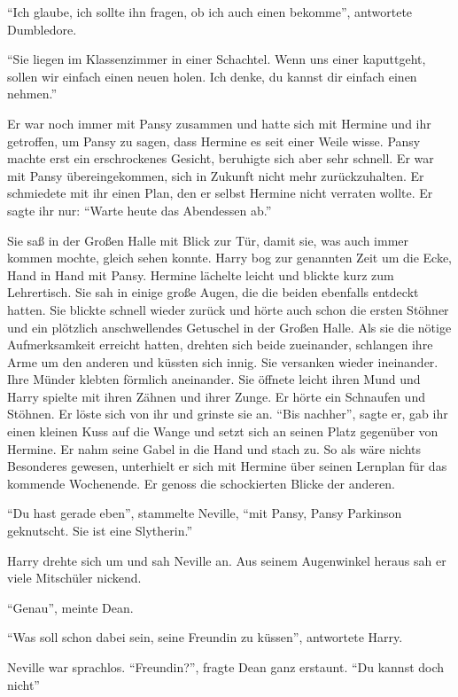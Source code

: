 \enquote{Ich glaube, ich sollte ihn fragen, ob ich auch einen bekomme}, antwortete Dumbledore.

\enquote{Sie liegen im Klassenzimmer in einer Schachtel. Wenn uns einer kaputtgeht, sollen wir einfach einen neuen holen. Ich denke, du kannst dir einfach einen nehmen.}

\trenn

Er war noch immer mit Pansy zusammen und hatte sich mit Hermine und ihr getroffen, um Pansy zu sagen, dass Hermine es seit einer Weile wisse. Pansy machte erst ein erschrockenes Gesicht, beruhigte sich aber sehr schnell. Er war mit Pansy übereingekommen, sich in Zukunft nicht mehr zurückzuhalten. Er schmiedete mit ihr einen Plan, den er selbst Hermine nicht verraten wollte. Er sagte ihr nur: \enquote{Warte heute das Abendessen ab.}

Sie saß in der Großen Halle mit Blick zur Tür, damit sie, was auch immer kommen mochte, gleich sehen konnte. Harry bog zur genannten Zeit um die Ecke, Hand in Hand mit Pansy. Hermine lächelte leicht und blickte kurz zum Lehrertisch. Sie sah in einige große Augen, die die beiden ebenfalls entdeckt hatten. Sie blickte schnell wieder zurück und hörte auch schon die ersten Stöhner und ein plötzlich anschwellendes Getuschel in der Großen Halle. Als sie die nötige Aufmerksamkeit erreicht hatten, drehten sich beide zueinander, schlangen ihre Arme um den anderen und küssten sich innig. Sie versanken wieder ineinander. Ihre Münder klebten förmlich aneinander. Sie öffnete leicht ihren Mund und Harry spielte mit ihren Zähnen und ihrer Zunge. Er hörte ein Schnaufen und Stöhnen. Er löste sich von ihr und grinste sie an. \enquote{Bis nachher}, sagte er, gab ihr einen kleinen Kuss auf die Wange und setzt sich an seinen Platz gegenüber von Hermine. Er nahm seine Gabel in die Hand und stach zu. So als wäre nichts Besonderes gewesen, unterhielt er sich mit Hermine über seinen Lernplan für das kommende Wochenende. Er genoss die schockierten Blicke der anderen.

\enquote{Du hast gerade eben\abs}, stammelte Neville, \enquote{mit Pansy, Pansy Parkinson geknutscht. Sie ist eine Slytherin.}

Harry drehte sich um und sah Neville an. Aus seinem Augenwinkel heraus sah er viele Mitschüler nickend.

\enquote{Genau}, meinte Dean.

\enquote{Was soll schon dabei sein, seine Freundin zu küssen}, antwortete Harry.

Neville war sprachlos. \enquote{Freundin?}, fragte Dean ganz erstaunt. \enquote{Du kannst doch nicht\abs}

